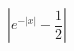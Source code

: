 \documentclass[preview]{standalone}
\begin{document}
\begin{center}
$|e^{-|x|} - \dfrac{1}{2}|$
\end{center}
\end{document}
